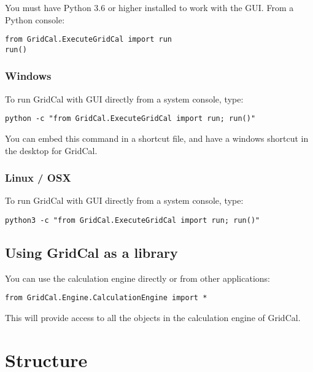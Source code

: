 \documentclass[11pt,fleqn]{book} %
\begin{document}
You must have Python 3.6 or higher installed to work with the GUI. From a Python console:

\begin{verbatim}
from GridCal.ExecuteGridCal import run
run()
\end{verbatim}

\subsection{Windows}

To run GridCal with GUI directly from a system console, type:\newline

\verb|python -c "from GridCal.ExecuteGridCal import run; run()"|\newline

You can embed this command in a shortcut file, and have a windows shortcut in the desktop for GridCal.

\subsection{Linux / OSX}

To run GridCal with GUI directly from a system console, type:\newline

\verb|python3 -c "from GridCal.ExecuteGridCal import run; run()"|\newline



\section{Using GridCal as a library}

You can use the calculation engine directly or from other applications: \newline

\verb|from GridCal.Engine.CalculationEngine import *| \newline

This will provide access to all the objects in the calculation engine of GridCal.



\chapter{Structure}
\end{document}
